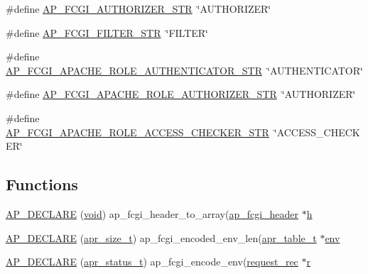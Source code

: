 \begin{DoxyCompactItemize}
\#define \hyperlink{group__APACHE__CORE__FASTCGI_gabd505a3a5825e79dce9fe0c6dcdcc2f4}{A\+P\+\_\+\+F\+C\+G\+I\+\_\+\+A\+U\+T\+H\+O\+R\+I\+Z\+E\+R\+\_\+\+S\+TR}~\char`\"{}A\+U\+T\+H\+O\+R\+I\+Z\+ER\char`\"{}
\item 
\#define \hyperlink{group__APACHE__CORE__FASTCGI_ga9bca9ed619fdcec30e9d0394355fe50e}{A\+P\+\_\+\+F\+C\+G\+I\+\_\+\+F\+I\+L\+T\+E\+R\+\_\+\+S\+TR}~\char`\"{}F\+I\+L\+T\+ER\char`\"{}
\item 
\#define \hyperlink{group__APACHE__CORE__FASTCGI_ga0485d7ed5e027bd3e0afb3a65b0e75d9}{A\+P\+\_\+\+F\+C\+G\+I\+\_\+\+A\+P\+A\+C\+H\+E\+\_\+\+R\+O\+L\+E\+\_\+\+A\+U\+T\+H\+E\+N\+T\+I\+C\+A\+T\+O\+R\+\_\+\+S\+TR}~\char`\"{}A\+U\+T\+H\+E\+N\+T\+I\+C\+A\+T\+OR\char`\"{}
\item 
\#define \hyperlink{group__APACHE__CORE__FASTCGI_gabbab8df2aea015014f50e02e2b658074}{A\+P\+\_\+\+F\+C\+G\+I\+\_\+\+A\+P\+A\+C\+H\+E\+\_\+\+R\+O\+L\+E\+\_\+\+A\+U\+T\+H\+O\+R\+I\+Z\+E\+R\+\_\+\+S\+TR}~\char`\"{}A\+U\+T\+H\+O\+R\+I\+Z\+ER\char`\"{}
\item 
\#define \hyperlink{group__APACHE__CORE__FASTCGI_ga2ecc24eb1b0d3d50bfe99d67ca6e36ef}{A\+P\+\_\+\+F\+C\+G\+I\+\_\+\+A\+P\+A\+C\+H\+E\+\_\+\+R\+O\+L\+E\+\_\+\+A\+C\+C\+E\+S\+S\+\_\+\+C\+H\+E\+C\+K\+E\+R\+\_\+\+S\+TR}~\char`\"{}A\+C\+C\+E\+S\+S\+\_\+\+C\+H\+E\+C\+K\+ER\char`\"{}
\end{DoxyCompactItemize}
\subsection*{Functions}
\begin{DoxyCompactItemize}
\item 
\hyperlink{group__APACHE__CORE__FASTCGI_ga274b023d928c30f32689910c79191d41}{A\+P\+\_\+\+D\+E\+C\+L\+A\+RE} (\hyperlink{group__MOD__ISAPI_gacd6cdbf73df3d9eed42fa493d9b621a6}{void}) ap\+\_\+fcgi\+\_\+header\+\_\+to\+\_\+array(\hyperlink{structap__fcgi__header}{ap\+\_\+fcgi\+\_\+header} $\ast$\hyperlink{pcregrep_8txt_a373589baca2cb79ec87f46d6599640b9}{h}
\item 
\hyperlink{group__APACHE__CORE__FASTCGI_ga0015453cd94ce8c5cf49a684d44f9655}{A\+P\+\_\+\+D\+E\+C\+L\+A\+RE} (\hyperlink{group__apr__platform_gaaa72b2253f6f3032cefea5712a27540e}{apr\+\_\+size\+\_\+t}) ap\+\_\+fcgi\+\_\+encoded\+\_\+env\+\_\+len(\hyperlink{structapr__table__t}{apr\+\_\+table\+\_\+t} $\ast$\hyperlink{group__apr__thread__proc_gaf265d8eb81b589ed808213bd43656deb}{env}
\item 
\hyperlink{group__APACHE__CORE__FASTCGI_ga7ee454dbe1d8a4602207f59905eb062a}{A\+P\+\_\+\+D\+E\+C\+L\+A\+RE} (\hyperlink{group__apr__errno_gaa5105fa83cc322f09382292db8b47593}{apr\+\_\+status\+\_\+t}) ap\+\_\+fcgi\+\_\+encode\+\_\+env(\hyperlink{structrequest__rec}{request\+\_\+rec} $\ast$\hyperlink{pcregrep_8txt_a2e9e9438b26c0bb4425367a7e4f75eb3}{r}
\end{DoxyCompactItemize}
